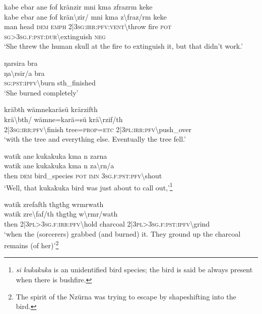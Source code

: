 \ea\label{ex:6:a1319}
kabe ebar ane fof kränzir mni kma zfrazrm keke\\
\gll kabe	ebar	ane	fof	krän{\textbackslash}zir/	mni	kma	z{\textbackslash}fraz/rm	keke\\
     man	head	\textsc{dem}	\textsc{emph}	2|3\textsc{sg}:\textsc{irr}:\textsc{pfv}:\textsc{vent}{\textbackslash}throw	fire	\textsc{pot}	\textsc{sg}>3\textsc{sg}.\textsc{f}:\textsc{pst}:\textsc{dur}{\textbackslash}extinguish	\textsc{neg}\\
\glt `She threw the human skull at the fire to extinguish it, but that didn't work.'
\z

\ea\label{ex:6:a1321}
ŋarsira bra\\
\gll ŋa{\textbackslash}rsir/a	bra\\
     \textsc{sg}:\textsc{pst}:\textsc{ipfv}{\textbackslash}burn	sth\_finished\\
\glt `She burned completely'
\z

\ea\label{ex:6:a1322}
kräbth wämnekaräsü krärzifth\\
\gll krä{\textbackslash}bth/	wämne=karä=sü	krä{\textbackslash}rzif/th\\
     2|3\textsc{sg}:\textsc{irr}:\textsc{pfv}{\textbackslash}finish	tree=\textsc{prop}=\textsc{etc}	2|3\textsc{pl}:\textsc{irr}:\textsc{pfv}{\textbackslash}push\_over\\
\glt `with the tree and everything else. Eventually the tree fell.'
\z

\ea\label{ex:6:a1325}
watik ane kukakuka kma n zarna\\
\gll watik	ane	kukakuka	kma	n	za{\textbackslash}rn/a\\
     then	\textsc{dem}	bird\_species	\textsc{pot}	\textsc{imn}	3\textsc{sg}.\textsc{f}:\textsc{pst}:\textsc{pfv}{\textbackslash}shout\\
\glt `Well, that kukakuka bird was just about to call out,'\footnote{\textit{si kukakuka} is an unidentified bird species; the bird is said be always present when there is bushfire.}
\z

\ea\label{ex:6:a1326}
watik zrefafth thgthg wrmrwath\\
\gll watik	zre{\textbackslash}faf/th	thgthg	w{\textbackslash}rmr/wath\\
     then	2|3\textsc{pl}>3\textsc{sg}.\textsc{f}:\textsc{irr}:\textsc{pfv}{\textbackslash}hold	charcoal	2|3\textsc{pl}>3\textsc{sg}.\textsc{f}:\textsc{pst}:\textsc{ipfv}{\textbackslash}grind\\
\glt `when the (sorcerers) grabbed (and burned) it. They ground up the charcoal remains (of her)'\footnote{The spirit of the Nzürna was trying to escape by shapeshifting into the bird.}
\z

